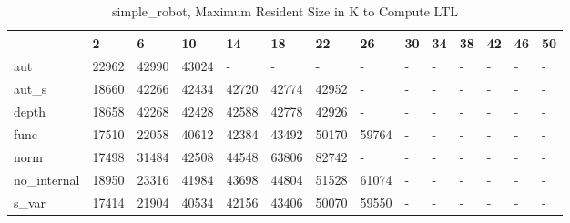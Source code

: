 \begin{table}
\caption{simple_robot, Maximum Resident Size in K to Compute LTL}
\label{simple_robot_LTL_size}
\begin{tabular}{llllllllllllll}
\toprule
 & 2 & 6 & 10 & 14 & 18 & 22 & 26 & 30 & 34 & 38 & 42 & 46 & 50 \\
\midrule
aut & 22962 & 42990 & 43024 & - & - & - & - & - & - & - & - & - & - \\
aut_s & 18660 & 42266 & 42434 & 42720 & 42774 & 42952 & - & - & - & - & - & - & - \\
depth & 18658 & 42268 & 42428 & 42588 & 42778 & 42926 & - & - & - & - & - & - & - \\
func & 17510 & 22058 & 40612 & 42384 & 43492 & 50170 & 59764 & - & - & - & - & - & - \\
norm & 17498 & 31484 & 42508 & 44548 & 63806 & 82742 & - & - & - & - & - & - & - \\
no_internal & 18950 & 23316 & 41984 & 43698 & 44804 & 51528 & 61074 & - & - & - & - & - & - \\
s_var & 17414 & 21904 & 40534 & 42156 & 43406 & 50070 & 59550 & - & - & - & - & - & - \\
\bottomrule
\end{tabular}
\end{table}
